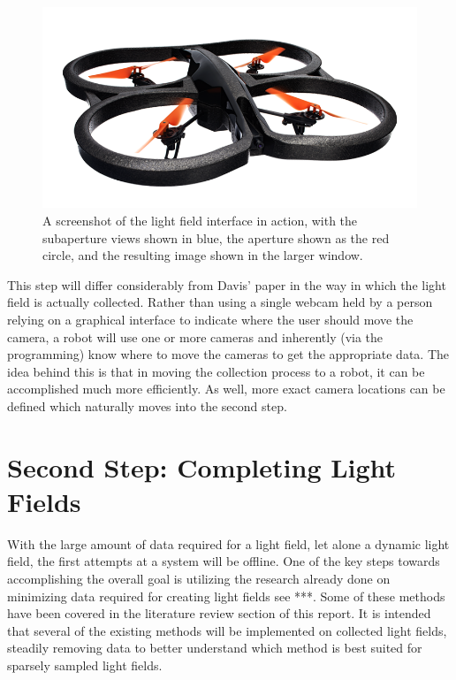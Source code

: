 \documentclass[12pt]{report}
\begin{document}
\begin{figure}[!ht]
	\centering
	\includegraphics[scale=0.4]{ardrone_image.png}
	\caption{A screenshot of the light field interface in action, with the subaperture views shown in blue, the aperture shown as the red circle, and the resulting image shown in the larger window.}
	\label{fig:ardrone_image}
\end{figure}

This step will differ considerably from Davis' paper in the way in which the light field is actually collected. Rather than using a single webcam held by a person relying on a graphical interface to indicate where the user should move the camera, a robot will use one or more cameras and inherently (via the programming) know where to move the cameras to get the appropriate data. The idea behind this is that in moving the collection process to a robot, it can be accomplished much more efficiently. As well, more exact camera locations can be defined which naturally moves into the second step.

\section{Second Step: Completing Light Fields}
With the large amount of data required for a light field, let alone a dynamic light field, the first attempts at a system will be offline. One of the key steps towards accomplishing the overall goal is utilizing the research already done on minimizing data required for creating light fields see ***. Some of these methods have been covered in the literature review section of this report. It is intended that several of the existing methods will be implemented on collected light fields, steadily removing data to better understand which method is best suited for sparsely sampled light fields.
\end{document}
